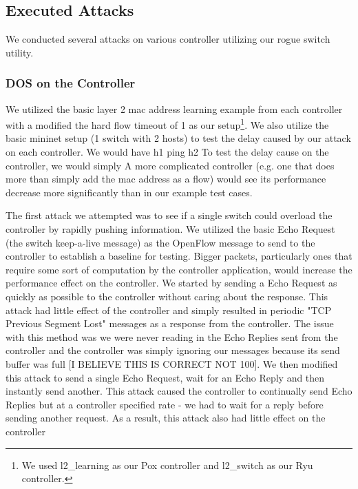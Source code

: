 
\subsection{Executed Attacks} 

We conducted several attacks on various controller utilizing our rogue switch utility. 

 \subsubsection{DOS on the Controller}
We utilized the basic layer 2 mac address learning example from each controller with a modified the hard flow timeout of 1 as our setup\footnote{We used l2\_learning as our Pox controller and l2\_switch as our Ryu controller.}. We also utilize the basic mininet setup (1 switch with 2 hosts) to test the delay caused by our attack on each controller. We would have h1 ping h2 To test the delay cause on the controller, we would simply A more complicated controller (e.g. one that does more than simply add the mac address as a flow) would see its performance decrease more significantly than in our example test cases.

 The first attack we attempted was to see if a single switch could overload the controller by rapidly pushing information. We utilized the basic Echo Request (the switch keep-a-live message) as the OpenFlow message to send to the controller to establish a baseline for testing. Bigger packets, particularly ones that require some sort of computation by the controller application, would increase the performance effect on the controller. We started by sending a Echo Request as quickly as possible to the controller without caring about the response. This attack had little effect of the controller and simply resulted in periodic "TCP Previous Segment Lost" messages as a response from the controller. The issue with this method was we were never reading in the Echo Replies sent from the controller and the controller was simply ignoring our messages because its send buffer was full [I BELIEVE THIS IS CORRECT NOT 100]. We then modified this attack to send a single Echo Request, wait for an Echo Reply and then instantly send another. This attack caused the controller to continually send Echo Replies but at a controller specified rate - we had to wait for a reply before sending another request. As a result, this attack also had little effect on the controller

